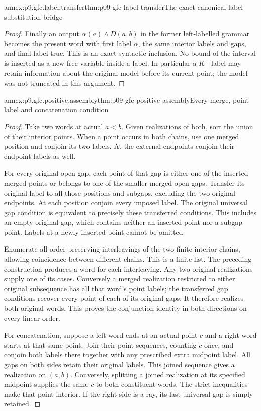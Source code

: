 \begin{annexitem}{annex:p9.gfc.label.transfer}{thm:p09-gfc-label-transfer}{The exact canonical-label substitution bridge}
\begin{proof}
Finally an output \(\alpha(a)\land D(a,b)\) in the former
left-labelled grammar becomes the present word with
first label \(\alpha\), the same interior labels and gaps,
and final label true. This is an exact syntactic inclusion.
No bound of the interval is inserted as a new free variable
inside a label. In particular a \(K^-\)-label may retain
information about the original model before its current
point; the model was not truncated in this argument.
\end{proof}
\end{annexitem}

\begin{annexitem}{annex:p9.gfc.positive.assembly}{thm:p09-gfc-positive-assembly}{Every merge, point label and concatenation condition}
\begin{proof}
Take two words at actual \(a<b\). Given realizations of
both, sort the union of their interior points. When a
point occurs in both chains, use one merged position
and conjoin its two labels. At the external endpoints
conjoin their endpoint labels as well.

For every original open gap, each point of that gap is
either one of the inserted merged points or belongs to
one of the smaller merged open gaps. Transfer its
original label to all those positions and subgaps,
excluding the two original endpoints. At each position
conjoin every imposed label. The original universal gap
condition is equivalent to precisely these transferred
conditions. This includes an empty original gap, which
contains neither an inserted point nor a subgap point.
Labels at a newly inserted point cannot be omitted.

Enumerate all order-preserving interleavings of the two
finite interior chains, allowing coincidence between
different chains. This is a finite list. The preceding
construction produces a word for each interleaving.
Any two original realizations supply one of its cases.
Conversely a merged realization restricted to either
original subsequence has all that word's point labels;
the transferred gap conditions recover every point of
each of its original gaps. It therefore realizes both
original words. This proves the conjunction identity
in both directions on every linear order.

For concatenation, suppose a left word ends at an actual
point \(c\) and a right word starts at that same point.
Join their point sequences, counting \(c\) once, and
conjoin both labels there together with any prescribed
extra midpoint label. All gaps on both sides retain their
original labels. This joined sequence gives a realization
on \((a,b)\). Conversely, splitting a joined realization
at its specified midpoint supplies the same \(c\) to
both constituent words. The strict inequalities make
that point interior. If the right side is a ray, its
last universal gap is simply retained.


\end{proof}
\end{annexitem}
